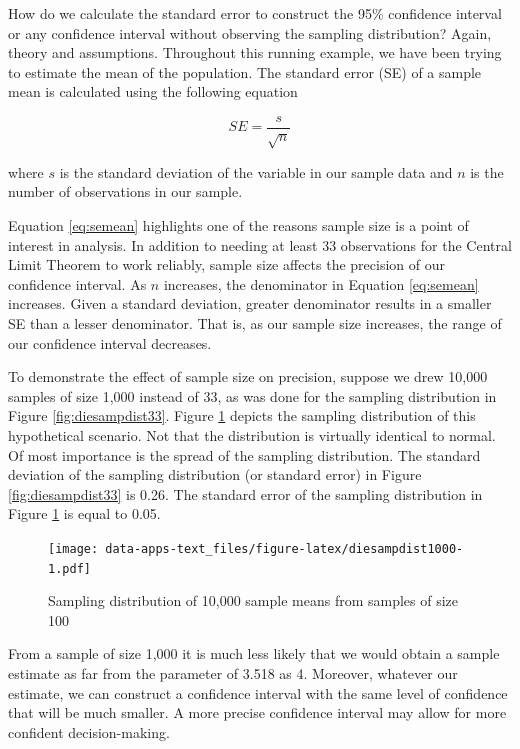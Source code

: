 \documentclass[
]{book}
\begin{document}
How do we calculate the standard error to construct the 95\% confidence interval or any confidence interval without observing the sampling distribution? Again, theory and assumptions. Throughout this running example, we have been trying to estimate the mean of the population. The standard error (SE) of a sample mean is calculated using the following equation

\begin{equation}
SE = \frac{s}{\sqrt{n}}
\label{eq:semean}
\end{equation}

where \(s\) is the standard deviation of the variable in our sample data and \(n\) is the number of observations in our sample.

Equation \eqref{eq:semean} highlights one of the reasons sample size is a point of interest in analysis. In addition to needing at least 33 observations for the Central Limit Theorem to work reliably, sample size affects the precision of our confidence interval. As \(n\) increases, the denominator in Equation \eqref{eq:semean} increases. Given a standard deviation, greater denominator results in a smaller SE than a lesser denominator. That is, as our sample size increases, the range of our confidence interval decreases.

To demonstrate the effect of sample size on precision, suppose we drew 10,000 samples of size 1,000 instead of 33, as was done for the sampling distribution in Figure \ref{fig:diesampdist33}. Figure \ref{fig:diesampdist1000} depicts the sampling distribution of this hypothetical scenario. Not that the distribution is virtually identical to normal. Of most importance is the spread of the sampling distribution. The standard deviation of the sampling distribution (or standard error) in Figure \ref{fig:diesampdist33} is 0.26. The standard error of the sampling distribution in Figure \ref{fig:diesampdist1000} is equal to 0.05.

\begin{figure}
\centering
\texttt{[image: data-apps-text\_files/figure-latex/diesampdist1000-1.pdf]}
\caption{\label{fig:diesampdist1000}Sampling distribution of 10,000 sample means from samples of size 100}
\end{figure}

From a sample of size 1,000 it is much less likely that we would obtain a sample estimate as far from the parameter of 3.518 as 4. Moreover, whatever our estimate, we can construct a confidence interval with the same level of confidence that will be much smaller. A more precise confidence interval may allow for more confident decision-making.
\end{document}
